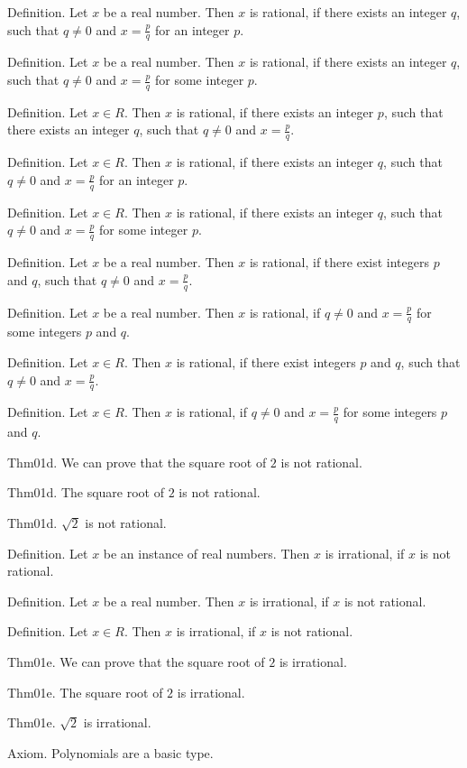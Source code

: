 \documentclass{article}
\begin{document}
Definition. Let $x$ be a real number. Then $x$ is rational, if there exists an integer $q$, such that $q \neq 0$ and $x = \frac{ p}{q}$ for an integer $p$.

Definition. Let $x$ be a real number. Then $x$ is rational, if there exists an integer $q$, such that $q \neq 0$ and $x = \frac{ p}{q}$ for some integer $p$.

Definition. Let $x \in R$. Then $x$ is rational, if there exists an integer $p$, such that there exists an integer $q$, such that $q \neq 0$ and $x = \frac{ p}{q}$.

Definition. Let $x \in R$. Then $x$ is rational, if there exists an integer $q$, such that $q \neq 0$ and $x = \frac{ p}{q}$ for an integer $p$.

Definition. Let $x \in R$. Then $x$ is rational, if there exists an integer $q$, such that $q \neq 0$ and $x = \frac{ p}{q}$ for some integer $p$.

Definition. Let $x$ be a real number. Then $x$ is rational, if there exist integers $p$ and $q$, such that $q \neq 0$ and $x = \frac{ p}{q}$.

Definition. Let $x$ be a real number. Then $x$ is rational, if $q \neq 0$ and $x = \frac{ p}{q}$ for some integers $p$ and $q$.

Definition. Let $x \in R$. Then $x$ is rational, if there exist integers $p$ and $q$, such that $q \neq 0$ and $x = \frac{ p}{q}$.

Definition. Let $x \in R$. Then $x$ is rational, if $q \neq 0$ and $x = \frac{ p}{q}$ for some integers $p$ and $q$.

Thm01d. We can prove that the square root of $2$ is not rational.

Thm01d. The square root of $2$ is not rational.

Thm01d. $\sqrt{ 2}$ is not rational.

Definition. Let $x$ be an instance of real numbers. Then $x$ is irrational, if $x$ is not rational.

Definition. Let $x$ be a real number. Then $x$ is irrational, if $x$ is not rational.

Definition. Let $x \in R$. Then $x$ is irrational, if $x$ is not rational.

Thm01e. We can prove that the square root of $2$ is irrational.

Thm01e. The square root of $2$ is irrational.

Thm01e. $\sqrt{ 2}$ is irrational.

Axiom. Polynomials are a basic type.
\end{document}

